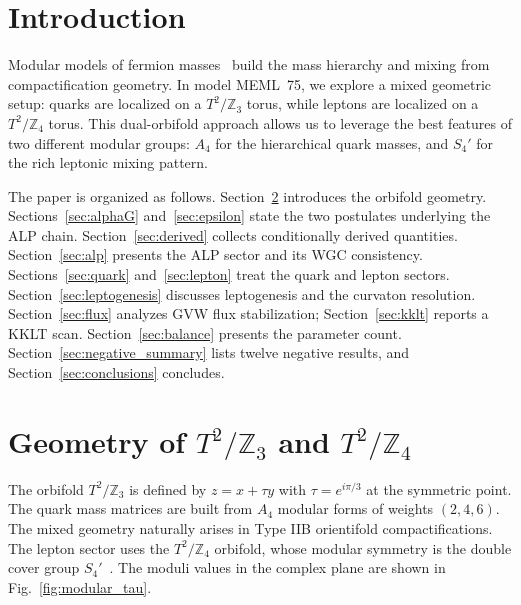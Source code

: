 \documentclass[12pt,a4paper]{article}
\numberwithin{equation}{section}
\begin{document}
\newpage

\section{Introduction}
Modular models of fermion masses~\cite{Feruglio2017,Kobayashi2019,Novichkov2019,Ding2021}
build the mass hierarchy and mixing from compactification geometry. In
model MEML~75, we explore a mixed geometric setup: quarks are localized
on a \(T^2/\mathbb{Z}_3\) torus, while leptons are localized on a
\(T^2/\mathbb{Z}_4\) torus. This dual-orbifold approach allows us to
leverage the best features of two different modular groups: \(A_4\) for
the hierarchical quark masses, and \(S_4'\) for the rich leptonic mixing
pattern.

The paper is organized as follows. Section~\ref{sec:geometry}
introduces the orbifold geometry. Sections~\ref{sec:alphaG}
and~\ref{sec:epsilon} state the two postulates underlying the ALP
chain. Section~\ref{sec:derived} collects conditionally derived
quantities. Section~\ref{sec:alp} presents the ALP sector and its
WGC consistency. Sections~\ref{sec:quark} and~\ref{sec:lepton}
treat the quark and lepton sectors. Section~\ref{sec:leptogenesis}
discusses leptogenesis and the curvaton resolution.
Section~\ref{sec:flux} analyzes GVW flux stabilization;
Section~\ref{sec:kklt} reports a KKLT scan.
Section~\ref{sec:balance} presents the parameter count.
Section~\ref{sec:negative_summary} lists twelve negative results, and
Section~\ref{sec:conclusions} concludes.

\section{Geometry of \(T^2/\mathbb{Z}_3\) and \(T^2/\mathbb{Z}_4\)}
\label{sec:geometry}
The orbifold \(T^2/\mathbb{Z}_3\) is defined by \(z = x + \tau y\) with
\(\tau = e^{i\pi/3}\) at the symmetric point. The quark mass matrices are
built from \(A_4\) modular forms of weights \((2,4,6)\). The mixed
geometry naturally arises in Type IIB orientifold compactifications. The
lepton sector uses the \(T^2/\mathbb{Z}_4\) orbifold, whose modular
symmetry is the double cover group \(S_4'\)~\cite{Novichkov2019,Ding2021}.
The moduli values in the complex plane are shown in Fig.~\ref{fig:modular_tau}.
\end{document}
